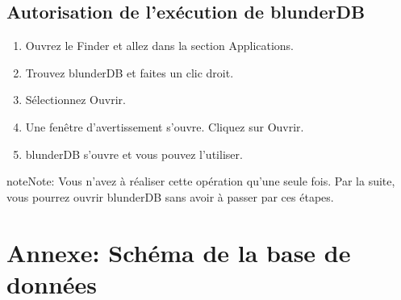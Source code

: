 \documentclass[letterpaper,10pt,french]{sphinxmanual}
\begin{document}
\subsection{Autorisation de l’exécution de blunderDB}
\label{\detokenize{annexe_mac_securite:autorisation-de-l-execution-de-blunderdb}}\begin{enumerate}
%
\item {} 
\sphinxAtStartPar
Ouvrez le Finder et allez dans la section Applications.

\item {} 
\sphinxAtStartPar
Trouvez blunderDB et faites un clic droit.

\item {} 
\sphinxAtStartPar
Sélectionnez Ouvrir.

\item {} 
\sphinxAtStartPar
Une fenêtre d’avertissement s’ouvre. Cliquez sur Ouvrir.

\item {} 
\sphinxAtStartPar
blunderDB s’ouvre et vous pouvez l’utiliser.

\end{enumerate}

\begin{sphinxadmonition}{note}{Note:}
\sphinxAtStartPar
Vous n’avez à réaliser cette opération qu’une seule fois. Par la
suite, vous pourrez ouvrir blunderDB sans avoir à passer par ces étapes.
\end{sphinxadmonition}

\sphinxstepscope


\section{Annexe: Schéma de la base de données}
\label{\detokenize{annexe_db_scheme:annexe-schema-de-la-base-de-donnees}}\label{\detokenize{annexe_db_scheme:annexe-db-migration}}\label{\detokenize{annexe_db_scheme::doc}}
\end{document}
